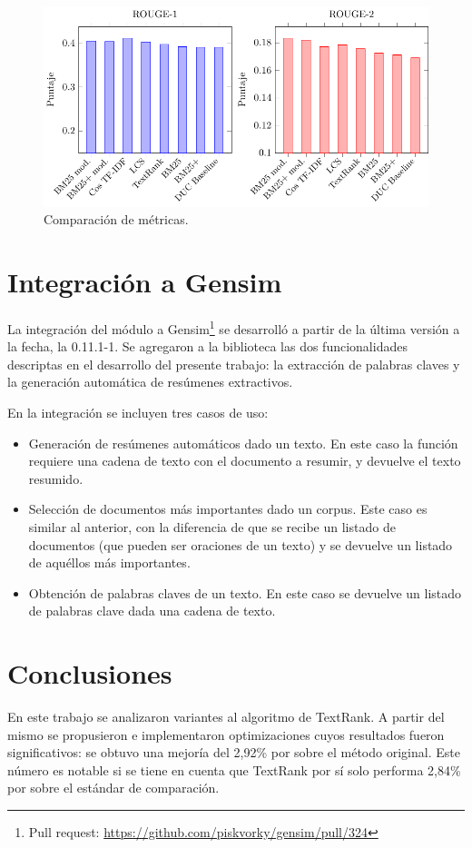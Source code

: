 \documentclass[a4paper]{article}
\begin{document}
\begin{figure}[h!]
    \centering
    \includegraphics[width=1\textwidth]{rouge-scores.pdf}
    \caption{Comparación de métricas.}
\end{figure}


\section{Integración a Gensim}
La integración del módulo a Gensim\footnote{Pull request: \url{https://github.com/piskvorky/gensim/pull/324}} se desarrolló a partir de la última versión a la fecha, la 0.11.1-1. 
Se agregaron a la biblioteca las dos funcionalidades descriptas en el desarrollo del presente trabajo: la extracción de palabras claves y la generación automática de resúmenes extractivos.

En la integración se incluyen tres casos de uso:
\begin{itemize}
\item Generación de resúmenes automáticos dado un texto. En este caso la función requiere una cadena de texto con el documento a resumir, y devuelve el texto resumido. 
\item Selección de documentos más importantes dado un corpus. Este caso es similar al anterior, con la diferencia de que se recibe un listado de documentos (que pueden ser oraciones de un texto) y se devuelve un listado de aquéllos más importantes.
\item Obtención de palabras claves de un texto. En este caso se devuelve un listado de palabras clave dada una cadena de texto.
\end{itemize}


\section{Conclusiones}
En este trabajo se analizaron variantes al algoritmo de TextRank. A partir del mismo se propusieron e implementaron optimizaciones cuyos resultados fueron significativos: se obtuvo una mejoría del 2,92\% por sobre el método original. Este número es notable si se tiene en cuenta que TextRank por sí solo performa 2,84\% por sobre el estándar de comparación.
\end{document}
